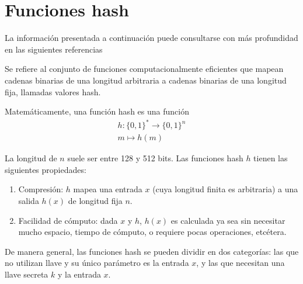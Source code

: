 %
%

\section{Funciones hash}
La información presentada a continuación puede consultarse con más profundidad
en las siguientes referencias
\cite{hash_hussein, menezes, DBLP:series/isc/DelfsK07, hash_gupta}

Se refiere al conjunto de funciones computacionalmente eficientes que
mapean cadenas binarias de una longitud arbitraria a cadenas binarias
de una longitud fija, llamadas valores hash.

Matemáticamente, una función hash es una función
\begin{equation}
  \label{funcion_hash_def}
  \begin{split}
    h: \{0, 1\}^* \longrightarrow \{0,1\}^n \\
    m \longmapsto h(m)
  \end{split}
\end{equation}

La longitud de $n$ suele ser entre 128 y 512 bits. Las funciones hash
$h$ tienen las siguientes propiedades:
\begin{enumerate}
  \item Compresión: $h$ mapea una entrada $x$ (cuya longitud
    finita es arbitraria) a una salida $h(x)$ de longitud fija $n$.
  \item Facilidad de cómputo: dada $x$ y $h$, $h(x)$ es
    calculada ya sea sin necesitar mucho espacio, tiempo de cómputo, o
    requiere pocas operaciones, etcétera.
\end{enumerate}

De manera general, las funciones hash se pueden dividir en dos
categorías: las que no utilizan llave y su único parámetro es la entrada
$x$, y las que necesitan una llave secreta $k$ y la entrada $x$.

